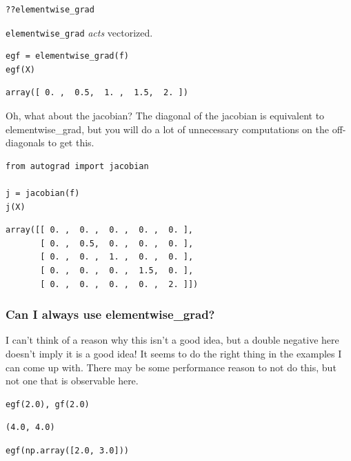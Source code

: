 \documentclass[11pt]{article}
\begin{document}
\begin{verbatim}
??elementwise_grad
\end{verbatim}

\texttt{elementwise\_grad} \emph{acts} vectorized.

\begin{verbatim}
egf = elementwise_grad(f)
egf(X)
\end{verbatim}

\begin{verbatim}
array([ 0. ,  0.5,  1. ,  1.5,  2. ])
\end{verbatim}

Oh, what about the jacobian? The diagonal of the jacobian is equivalent to elementwise\_grad, but you will do a lot of unnecessary computations on the off-diagonals to get this.

\begin{verbatim}
from autograd import jacobian

j = jacobian(f)
j(X)
\end{verbatim}

\begin{verbatim}
array([[ 0. ,  0. ,  0. ,  0. ,  0. ],
       [ 0. ,  0.5,  0. ,  0. ,  0. ],
       [ 0. ,  0. ,  1. ,  0. ,  0. ],
       [ 0. ,  0. ,  0. ,  1.5,  0. ],
       [ 0. ,  0. ,  0. ,  0. ,  2. ]])
\end{verbatim}

\subsubsection{Can I always use elementwise\_grad?}
\label{sec:orgbc30e89}

I can't think of a reason why this isn't a good idea, but a double negative here doesn't imply it is a good idea! It seems to do the right thing in the examples I can come up with. There may be some performance reason to not do this, but not one that is observable here.

\begin{verbatim}
egf(2.0), gf(2.0)
\end{verbatim}

\begin{verbatim}
(4.0, 4.0)
\end{verbatim}

\begin{verbatim}
egf(np.array([2.0, 3.0]))
\end{verbatim}
\end{document}
